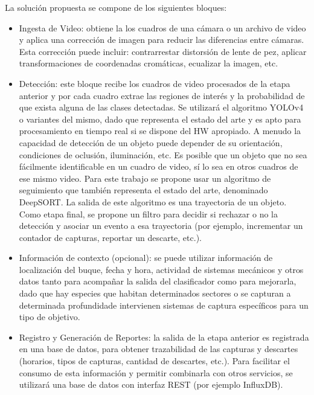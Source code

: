 \documentclass[11pt]{charter}
\begin{document}
La solución propuesta se compone de los siguientes bloques:

\begin{itemize}
\item Ingesta de Video: obtiene la los cuadros de una cámara o un archivo de video y aplica una corrección de imagen para reducir las diferencias entre cámaras. Esta corrección puede incluir: contrarrestar distorsión de lente de pez, aplicar transformaciones de coordenadas cromáticas, ecualizar la imagen, etc.

\item Detección: este bloque recibe los cuadros de video procesados de la etapa anterior y por cada cuadro extrae las regiones de interés y la probabilidad de que exista alguna de las clases detectadas. Se utilizará el algoritmo YOLOv4 o variantes del mismo, dado que representa el estado del arte y es apto para procesamiento en tiempo real si se dispone del HW apropiado. A menudo la capacidad de detección de un objeto puede depender de su orientación, condiciones de oclusión, iluminación, etc. Es posible que un objeto que no sea fácilmente identificable en un cuadro de video, sí lo sea en otros cuadros de ese mismo video. Para este trabajo se propone usar un algoritmo de seguimiento que también representa el estado del arte, denominado DeepSORT. La salida de este algoritmo es una trayectoria de un objeto. Como etapa final, se propone un filtro para decidir si rechazar o no la detección y asociar un evento a esa trayectoria (por ejemplo, incrementar un contador de capturas, reportar un descarte, etc.).

\item Información de contexto (opcional): se puede utilizar información de localización del buque, fecha y hora, actividad de sistemas mecánicos y otros datos tanto para acompañar la salida del clasificador como para mejorarla, dado que hay especies que habitan determinados sectores o se capturan a determinada profundidade intervienen sistemas de captura específicos para un tipo de objetivo.

\item Registro y Generación de Reportes: la salida de la etapa anterior es registrada en una base de datos, para obtener trazabilidad de las capturas y descartes (horarios, tipos de capturas, cantidad de descartes, etc.). Para facilitar el consumo de esta información y permitir combinarla con otros servicios, se utilizará una base de datos con interfaz REST (por ejemplo InfluxDB).
\end{itemize}
\end{document}
